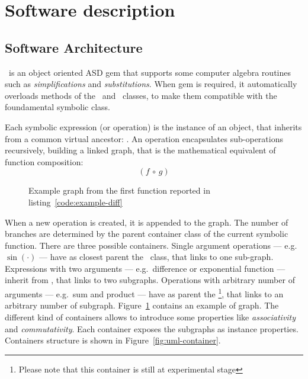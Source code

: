\section{Software description}
\label{sec:description}


\subsection{Software Architecture}
\label{sec:architecture}


\ragnicas~is an object oriented ASD gem that supports some computer algebra routines such as \emph{simplifications} and \emph{substitutions}. When gem is required, it automatically overloads methods of the \Fixnum~and \Float~classes, to make them compatible with the foundamental symbolic class.

Each symbolic expression (or operation) is the instance of an object, that inherits from a common virtual ancestor: \CASOp. An operation encapsulates sub-operations recursively, building a linked graph, that is the mathematical equivalent of function composition:
\begin{equation}
\left( f \, \circ \, g \right)
\end{equation}

\begin{figure}[ht!]
\label{fig:graph}
\centering

\caption{Example graph from the first function reported in listing~\ref{code:example-diff}}
\end{figure}

When a new operation is created, it is appended to the graph. The number of branches are determined by the parent container class of the current symbolic function. There are three possible containers. Single argument operations --- e.g. $\sin(\cdot)$ --- have as closest parent the \CASOp~class, that links to one sub-graph. Expressions with two arguments --- e.g.\ difference or exponential function --- inherit from \CASBinaryOp, that links to two subgraphs. Operations with arbitrary number of arguments --- e.g.\ sum and product --- have as parent the \CASNaryOp\footnote{Please note that this container is still at experimental stage}, that links to an arbitrary number of subgraph. Figure~\ref{fig:graph} contains an example of graph. The different kind of containers allows to introduce some properties like \emph{associativity} and \emph{commutativity}. Each container exposes the subgraphs as instance properties. Containers structure is shown in Figure~\ref{fig:uml-container}.

